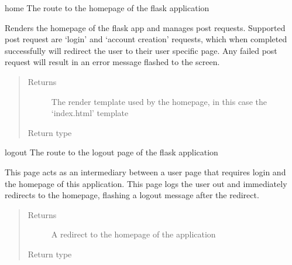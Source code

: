 \documentclass[letterpaper,10pt,english]{sphinxmanual}
\begin{document}
\begin{fulllineitems}
\label{\detokenize{flaskapp:flaskapp.app.home}}
home The route to the homepage of the flask application

Renders the homepage of the flask app and manages post requests.
Supported post request are ‘login’ and ‘account creation’ requests,
which when completed successfully will redirect the user to their
user specific page. Any failed post request will result in an error
message flashed to the screen.
\begin{quote}\begin{description}
\item[{Returns}] \leavevmode
The render template used by the homepage, in this case the ‘index.html’ template

\item[{Return type}] \leavevmode
{}

\end{description}\end{quote}

\end{fulllineitems}


\begin{fulllineitems}
\label{\detokenize{flaskapp:flaskapp.app.logout}}
logout The route to the logout page of the flask application

This page acts as an intermediary between a user page that requires login
and the homepage of this application. This page logs the user out and
immediately redirects to the homepage, flashing a logout message after
the redirect.
\begin{quote}\begin{description}
\item[{Returns}] \leavevmode
A redirect to the homepage of the application

\item[{Return type}] \leavevmode
{}

\end{description}\end{quote}

\end{fulllineitems}
\end{document}
